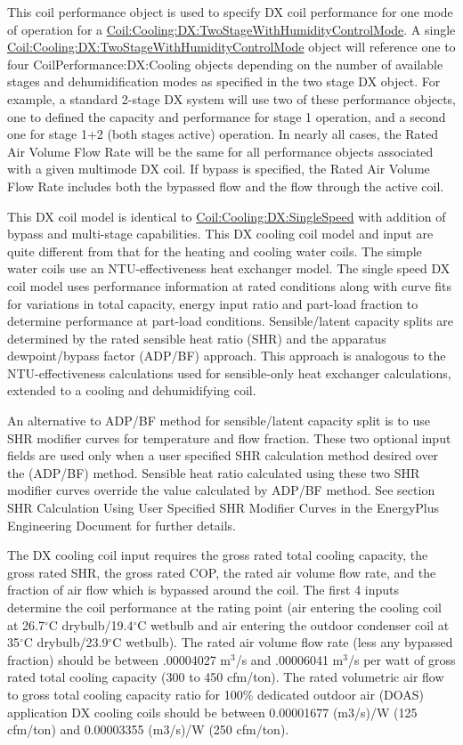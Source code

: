 This coil performance object is used to specify DX coil performance for one mode of operation for a \hyperref[coilcoolingdxtwostagewithhumiditycontrolmode]{Coil:Cooling:DX:TwoStageWithHumidityControlMode}. A single \hyperref[coilcoolingdxtwostagewithhumiditycontrolmode]{Coil:Cooling:DX:TwoStageWithHumidityControlMode} object will reference one to four CoilPerformance:DX:Cooling objects depending on the number of available stages and dehumidification modes as specified in the two stage DX object. For example, a standard 2-stage DX system will use two of these performance objects, one to defined the capacity and performance for stage 1 operation, and a second one for stage 1+2 (both stages active) operation. In nearly all cases, the Rated Air Volume Flow Rate will be the same for all performance objects associated with a given multimode DX coil. If bypass is specified, the Rated Air Volume Flow Rate includes both the bypassed flow and the flow through the active coil.

This DX coil model is identical to \hyperref[coilcoolingdxsinglespeed]{Coil:Cooling:DX:SingleSpeed} with addition of bypass and multi-stage capabilities. This DX cooling coil model and input are quite different from that for the heating and cooling water coils. The simple water coils use an NTU-effectiveness heat exchanger model. The single speed DX coil model uses performance information at rated conditions along with curve fits for variations in total capacity, energy input ratio and part-load fraction to determine performance at part-load conditions. Sensible/latent capacity splits are determined by the rated sensible heat ratio (SHR) and the apparatus dewpoint/bypass factor (ADP/BF) approach. This approach is analogous to the NTU-effectiveness calculations used for sensible-only heat exchanger calculations, extended to a cooling and dehumidifying coil.

An alternative to ADP/BF method for sensible/latent capacity split is to use SHR modifier curves for temperature and flow fraction. These two optional input fields are used only when a user specified SHR calculation method desired over the (ADP/BF) method. Sensible heat ratio calculated using these two SHR modifier curves override the value calculated by ADP/BF method. See section SHR Calculation Using User Specified SHR Modifier Curves in the EnergyPlus Engineering Document for further details.

The DX cooling coil input requires the gross rated total cooling capacity, the gross rated SHR, the gross rated COP, the rated air volume flow rate, and the fraction of air flow which is bypassed around the coil. The first 4 inputs determine the coil performance at the rating point (air entering the cooling coil at 26.7$^\circ$C drybulb/19.4$^\circ$C wetbulb and air entering the outdoor condenser coil at 35$^\circ$C drybulb/23.9$^\circ$C wetbulb). The rated air volume flow rate (less any bypassed fraction) should be between .00004027 m\(^{3}\)/s and .00006041 m\(^{3}\)/s per watt of gross rated total cooling capacity (300 to 450 cfm/ton). The rated volumetric air flow to gross total cooling capacity ratio for 100\% dedicated outdoor air (DOAS) application DX cooling coils should be between 0.00001677 (m3/s)/W (125 cfm/ton) and 0.00003355 (m3/s)/W (250 cfm/ton).

